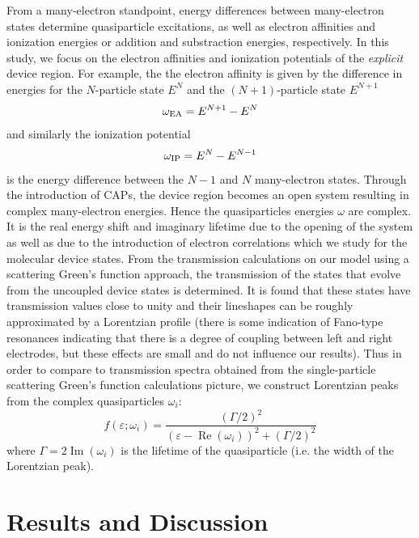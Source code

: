 From a many-electron standpoint, energy differences between
many-electron states determine quasiparticle excitations, as well as
electron affinities and ionization energies or addition and substraction
energies, respectively. In this study, we focus on the electron
affinities and ionization potentials of the {\it explicit} device
region. For example, the the electron affinity is given by the
difference in energies for the $N$-particle state $E^N$ and the
$(N+1)$-particle state $E^{N+1}$
\begin{equation}
\omega_{\rm EA} = E^{N+1} -E^N
\end{equation}
and similarly the ionization potential
\begin{equation}
\omega_{\rm IP} =  E^N - E^{N-1}
\end{equation}
is the energy difference between the $N-1$ and $N$ many-electron states.
Through the introduction of \acp{CAP}, the device region becomes an open
system resulting in complex many-electron energies. Hence the
quasiparticles energies $\omega$ are complex. It is the real energy
shift and imaginary lifetime due to the opening of the system as well
as due to the introduction of electron correlations which we study for
the molecular device states.
From the transmission calculations on our model using a scattering Green's
function approach, the transmission of the states that evolve from the
uncoupled device states is determined. It is found that these states have
transmission values close to unity and their lineshapes can be roughly
approximated by a Lorentzian profile (there is some indication of Fano-type
resonances indicating that there is a degree of coupling between left and
right electrodes, but these effects are small and do not influence our
results). Thus in order to compare to transmission spectra obtained from the
single-particle scattering Green's function calculations picture, we construct
Lorentzian peaks from the complex quasiparticles $\omega_i$:
\begin{equation}
        f(\varepsilon;\omega_i)
        = \frac{\left( \Gamma/2 \right)^2}
               {(\varepsilon - \operatorname{Re}(\omega_i))^2
               + \left( \Gamma/2 \right)^2}
        \label{eq:lobro}
\end{equation}
where $\Gamma = 2 \operatorname{Im}(\omega_i)$ is the lifetime of the
quasiparticle (i.e. the width of the Lorentzian peak).

\section{Results and Discussion}
\label{sec:results}


